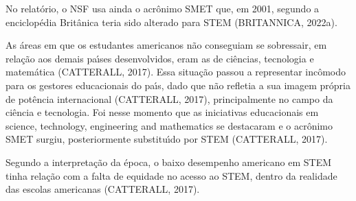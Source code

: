 \documentclass[
12pt,		%
openright,	%
twoside,  %
a4paper,			%
chapter=TITLE,		%
english,			%
french,				%
spanish,			%
brazil				%
]{USPSC-classe/USPSC}
\begin{document}
\noindent\begin{center}\mbox{\centering{}}\end{center}


No relat\'orio, o NSF usa ainda o acr\^onimo SMET que, em 2001, segundo a enciclop\'edia Brit\^anica teria sido alterado para STEM (BRITANNICA, 2022a).

















As \'areas em que os estudantes americanos n\~ao conseguiam se sobressair, em rela\c{c}\~ao aos demais pa\'{\i}ses desenvolvidos, eram as de ci\^encias, tecnologia e matem\'atica  (CATTERALL, 2017). Essa situa\c{c}\~ao passou a representar inc\^omodo para os gestores educacionais do pa\'{\i}s, dado que n\~ao refletia a sua imagem pr\'opria de pot\^encia internacional  (CATTERALL, 2017), principalmente no campo da ci\^encia e tecnologia. Foi nesse momento que as iniciativas educacionais em \textquotedbl science, technology, engineering and mathematics se destacaram e o acr\^onimo SMET surgiu, posteriormente substitu\'{\i}do por STEM  (CATTERALL, 2017).

















Segundo a interpreta\c{c}\~ao da \'epoca, o baixo desempenho americano em STEM tinha rela\c{c}\~ao com a falta de equidade no acesso ao STEM, dentro da realidade das escolas americanas  (CATTERALL, 2017).
\end{document}
